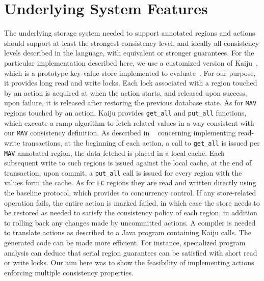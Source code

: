 \documentclass[preprint,numbers]{sigplanconf}
\begin{document}
\section{Underlying System Features}
\label{sec:underlyingsys}
The underlying storage system needed to support annotated regions and actions should
support at least the strongest consistency level, and ideally all consistency
levels described in the language, with equivalent or stronger
guarantees. For the particular implementation described here, we use a customized
version of Kaiju~\cite{kaiju}, which is a prototype key-value store implemented to
evaluate~\cite{bailis2014scalable}. For our purpose, it provides long read and
write locks. Each lock associated with a region touched by an action is acquired
at when the action starts, and released upon success, upon failure, it is
released after restoring the previous database state. As for \texttt{MAV}
regions touched by an action, Kaiju provides
\texttt{get\_all} and \texttt{put\_all} functions, which execute a ramp algorithm
to fetch related values in a way consistent with our \texttt{MAV} consistency
definition. As described in ~\cite{bailis2014scalable} concerning implementing
read-write transactions, at the beginning of each action, a call to
\texttt{get\_all} is issued per \texttt{MAV} annotated region, the data fetched
is placed in a local cache. Each subsequent write to such regions is issued
against the local cache, at the end of transaction, upon commit, a
\texttt{put\_all} call
is issued for every region with the values form the cache. As for \texttt{EC}
regions they are read and written directly using the baseline protocol, which
provides to concurrency control. If any store-related operation fails, the
entire action is marked failed, in which case the store needs to be restored as
needed to satisfy the consistency policy of each region, in addition to rolling
back any changes made by uncommitted actions. A compiler is needed to translate
actions as described to a Java program containing Kaiju calls. The generated code can be made more 
efficient. For instance, specialized program analysis can deduce that serial 
region guarantees can be  satisfied with short read or write locks. Our aim here
was to show the feasibility of implementing actions enforcing multiple
consistency properties. 
\end{document}
